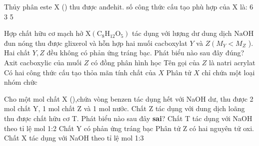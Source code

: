 \begin{ex}[2][][]
	Thủy phân este X () thu được anđehit. số công thức cấu tạo phù hợp của X là:
	\choice
	{%
		6
	}
	{%
		3
	}
	{%
	}
	{%
		5
	}

	\sodongkeex[4]
\end{ex}


\begin{ex}
	Hợp chất hữu cơ mạch hở $\mathrm{X}\left(\mathrm{C}_8 \mathrm{H}_{12} \mathrm{O}_5\right)$ tác dụng với lượng dư dung dịch $\mathrm{NaOH}$ đun nóng thu được glixerol và hỗn hợp hai muối cacboxylat $Y$ và $Z\left(M_Y<M_Z\right.$ ). Hai chất $Y, Z$ đều không có phản ứng tráng bạc. Phát biểu nào sau đây đúng?
	\choice
	{%
		Axit cacboxylic của muối $Z$ có đồng phân hình học
	}
	{%
		\True Tên gọi của $Z$ là natri acrylat
	}
	{%
		Có hai công thức cấu tạo thỏa mãn tính chất của $X$
	}
	{%
		Phân tử $X$ chỉ chứa một loại nhóm chức
	}

	\sodongkeex[4]
\end{ex}



\begin{ex}
	Cho một mol chất X (),chứa vòng benzen tác dụng hết với NaOH dư, thu được 2 mol chất Y, 1 mol chất Z và 1 mol nước. Chất Z tác dụng với dung dịch  loãng thu được chất hữu cơ T. Phát biểu nào sau đây\textbf{ sai}?
	\choice
	{%
		\True Chất T tác dụng với NaOH theo tỉ lệ mol 1:2
	}
	{%
		Chất Y có phản ứng tráng bạc
	}
	{%
		Phân tử Z có hai nguyên tử oxi.
	}
	{%
		Chất X tác dụng với NaOH theo tỉ lệ mol 1:3
	}

	\sodongkeex[4]
\end{ex}

